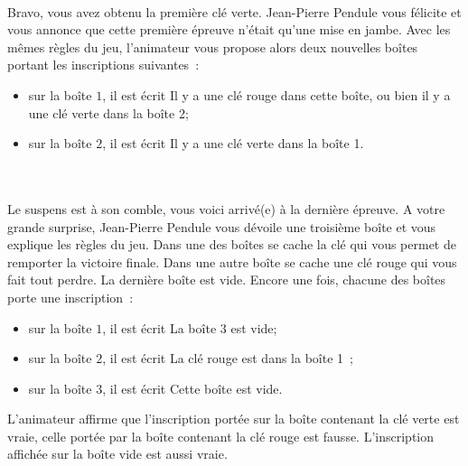 \documentclass[11pt,a4paper]{article}
\begin{document}
\begin{Exercise}[title = {Logique et calcul des propositions}, origin = {\bac \; {\sc ccinp 2018 - mp}}]
	\ExePart[name = {Deuxième épreuve}]\\
	Bravo, vous avez obtenu la première clé verte.
	Jean-Pierre Pendule vous félicite et vous annonce que cette première épreuve n'était qu'une mise en jambe.
	Avec les mêmes règles du jeu, l'animateur vous propose alors deux nouvelles boîtes portant les inscriptions suivantes~:
	\begin{itemize}
		\item sur la boîte $1$, il est écrit \og{}Il y a une clé rouge dans cette boîte, ou bien il y a une clé verte dans la boîte 2\fg{};
		\item  sur la boîte $2$, il est écrit \og{}Il y a une clé verte dans la boîte 1\fg{}.
	\end{itemize}
	\\


	\ExePart[name = {Troisième épreuve}]\\
	Le suspens est à son comble, vous voici arrivé(e) à la dernière épreuve.
	A votre grande surprise, Jean-Pierre Pendule vous dévoile une troisième boîte et vous explique les règles du jeu.
	Dans une des boîtes se cache la clé qui vous permet de remporter la victoire finale.
	Dans une autre boîte se cache une clé rouge qui vous fait tout perdre.
	La dernière boîte est vide.
	Encore une fois, chacune des boîtes porte une inscription~:
	\begin{itemize}
		\item sur la boîte $1$, il est écrit \og{}La boîte 3 est vide\fg{};
		\item  sur la boîte $2$, il est écrit \og{}La clé rouge est dans la boîte 1\fg{}~;
		\item  sur la boîte $3$, il est écrit \og{}Cette boîte est vide\fg{}.
	\end{itemize}
	L'animateur affirme que l'inscription portée sur la boîte contenant la clé verte est vraie, celle portée par la boîte contenant la clé rouge est fausse.
	L'inscription affichée sur la boîte vide est aussi vraie.

\end{Exercise}
\end{document}
